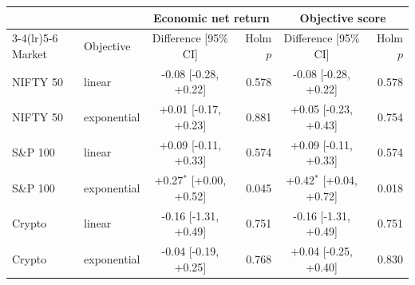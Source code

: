 \begin{tabular}{llcrcr}
\toprule
& & \multicolumn{2}{c}{Economic net return} & \multicolumn{2}{c}{Objective score} \\
\cmidrule(lr){3-4}\cmidrule(lr){5-6}
Market & Objective & Difference [95\% CI] & Holm $p$ & Difference [95\% CI] & Holm $p$ \\
\midrule
NIFTY 50 & linear & -0.08 [-0.28, +0.22] & 0.578 & -0.08 [-0.28, +0.22] & 0.578 \\
NIFTY 50 & exponential & +0.01 [-0.17, +0.23] & 0.881 & +0.05 [-0.23, +0.43] & 0.754 \\
S\&P 100 & linear & +0.09 [-0.11, +0.33] & 0.574 & +0.09 [-0.11, +0.33] & 0.574 \\
S\&P 100 & exponential & +0.27$^{*}$ [+0.00, +0.52] & 0.045 & +0.42$^{*}$ [+0.04, +0.72] & 0.018 \\
Crypto & linear & -0.16 [-1.31, +0.49] & 0.751 & -0.16 [-1.31, +0.49] & 0.751 \\
Crypto & exponential & -0.04 [-0.19, +0.25] & 0.768 & +0.04 [-0.25, +0.40] & 0.830 \\
\bottomrule
\end{tabular}
